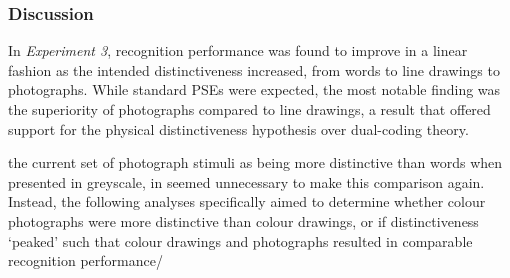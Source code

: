 \documentclass[
  11pt,
]{article}
\begin{document}
\begin{table}[!h]
\centering\begingroup\fontsize{13}{15}\selectfont

\endgroup{}
\end{table}

\hypertarget{discussion-3}{%
\subsubsection{Discussion}\label{discussion-3}}

In \emph{Experiment 3}, recognition performance was found to improve in
a linear fashion as the intended distinctiveness increased, from words
to line drawings to photographs. While standard PSEs were expected, the
most notable finding was the superiority of photographs compared to line
drawings, a result that offered support for the physical distinctiveness
hypothesis over dual-coding theory.

the current set of photograph stimuli as being more distinctive than
words when presented in greyscale, in seemed unnecessary to make this
comparison again. Instead, the following analyses specifically aimed to
determine whether colour photographs were more distinctive than colour
drawings, or if distinctiveness `peaked' such that colour drawings and
photographs resulted in comparable recognition performance/
\end{document}
